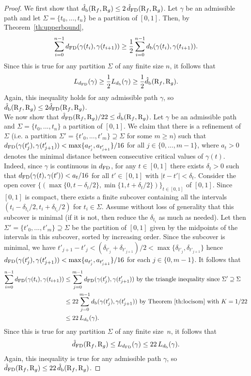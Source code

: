 \begin{proof}
We first show that $\hat d_{\rm b}(\mathrm{R}_f,\mathrm{R}_g)\leq 2\,\hat d_{\rm FD}(\mathrm{R}_f,\mathrm{R}_g)$. 
Let $\gamma$ be an admissible path 
and let $\Sigma=\{t_0,...,t_n\}$ be a partition of $[0,1]$.
Then, by Theorem~\ref{th:upperbound}, 
$$\sum_{i=0}^{n-1} d_{\rm FD}(\gamma(t_{i}), \gamma(t_{i+1}))\geq
\frac{1}{2}\sum_{i=0}^{n-1} d_{\rm b}(\gamma(t_{i}), \gamma(t_{i+1})).$$
Since this is true for any partition $\Sigma$ of any finite size $n$, it
follows that
$$L_{d_{\rm FD}} (\gamma) \geq \frac{1}{2} L_{d_{\rm b}}(\gamma)\geq\frac{1}{2} \hat d_{\rm b}(\mathrm{R}_f,\mathrm{R}_g).$$
Again, this inequality holds for any admissible path $\gamma$, so $\hat d_{\rm b}(\mathrm{R}_f,\mathrm{R}_g)\leq 2\hat d_{\rm FD}(\mathrm{R}_f,\mathrm{R}_g)$. \\
%
We now show that $\hat d_{\rm FD}(\mathrm{R}_f,\mathrm{R}_g)/22\leq \hat d_{\rm b}(\mathrm{R}_f,\mathrm{R}_g)$.
Let $\gamma$ be an admissible path 
and $\Sigma=\{t_0,...,t_n\}$ a partition of $[0,1]$.  We claim that
there is a refinement of $\Sigma$ (i.e. a partition
$\Sigma'=\{t'_0,...,t'_m\}\supseteq \Sigma$ for some $m\geq n$) such
that $d_{\rm FD}(\gamma(t'_{j}),\gamma(t'_{j+1})) <
\max\{a_{t'_j},a_{t'_{j+1}}\}/16$ for all $j \in \{0,...,m-1\}$, where
$a_t>0$ denotes the minimal distance between consecutive
critical values of $\gamma(t)$. Indeed, since $\gamma$ is continuous
in $d_{\rm FD}$, for any $t\in[0,1]$ there exists $\delta_t >0$ such that
$d_{\rm FD}(\gamma(t),\gamma(t')) < a_t/16$ for all $t'\in [0,1]$ with
$|t-t'| < \delta_t$.  Consider the open cover
$\{(\max\{0,t-\delta_t/2\},\min\{1,t+\delta_t/2\})\}_{t\in[0,1]}$ of
$[0,1]$.  Since $[0,1]$ is compact, there exists a finite subcover
containing all the intervals $(t_i-\delta_{t_i}/2,t_i+\delta_{t_i}/2)$
for $t_i\in\Sigma$.  Assume without loss of generality that this subcover is minimal (if
it is not, then reduce the $\delta_{t_i}$ as much as needed).  Let then
$\Sigma'=\{t'_0,...,t'_m\}\supseteq \Sigma$ be the partition of
$[0,1]$ given by the midpoints of the intervals in this subcover,
sorted by increasing order.  Since the subcover is minimal, we have
$t'_{j+1}-t'_j < (\delta_{t'_j}+\delta_{t'_{j+1}})/2 <
\max\{\delta_{t'_j},\delta_{t'_{j+1}}\}$ hence
$d_{\rm FD}(\gamma(t'_j),\gamma(t'_{j+1})) <
\max\{a_{t'_j},a_{t'_{j+1}}\}/16$ for each $j\in\{0,m-1\}$. It follows
that
\begin{align}
\sum_{i=0}^{n-1} \distfd(\gamma(t_{i}), \gamma(t_{i+1}))&\leq\sum_{j=0}^{m-1} \distfd(\gamma(t'_{j}), \gamma(t'_{j+1})){\rm\ by\ the\ triangle\ inequality\ since\ }\Sigma'\supseteq\Sigma\nonumber\\
&\leq \const\sum_{j=0}^{m-1} \distb(\gamma(t'_{j}), \gamma(t'_{j+1})){\rm\ by\ Theorem~\ref{th:locisom}\ with\ }K=1/22\nonumber\\
&\leq \const\, L_{\distb}(\gamma)\nonumber.
\end{align}
Since this is true for any partition $\Sigma$ of any finite size~$n$, it follows that 
$$\hat d_{\rm FD}(\mathrm{R}_f,\mathrm{R}_g)\leq L_{d_{\rm FD}}(\gamma)\leq 22\, L_{d_{\rm b}}(\gamma).$$
Again, this inequality is true for any admissible path $\gamma$, so $\hat d_{\rm FD}(\mathrm{R}_f,\mathrm{R}_g)\leq 22\,\hat d_{\rm b}(\mathrm{R}_f,\mathrm{R}_g)$.
\end{proof}

